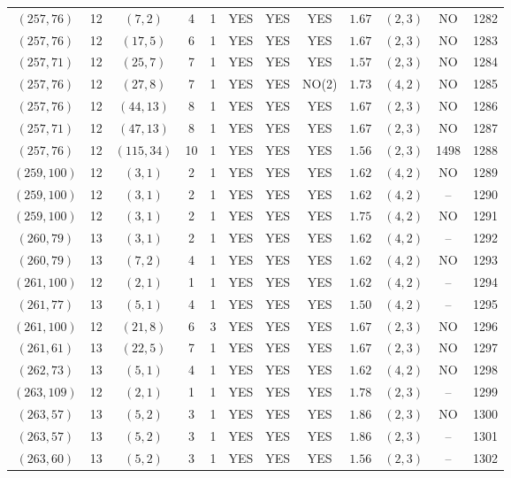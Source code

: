 \begin{longtable}{|c|c|c|c|c|c|c|c|c|c|c|c|}
$(257,76)$ & 12 & $(7,2)$ & 4 & 1 & YES & YES & YES & $1.67$ & $(2,3)$ & NO & 1282\\
$(257,76)$ & 12 & $(17,5)$ & 6 & 1 & YES & YES & YES & $1.67$ & $(2,3)$ & NO & 1283\\
$(257,71)$ & 12 & $(25,7)$ & 7 & 1 & YES & YES & YES & $1.57$ & $(2,3)$ & NO & 1284\\
$(257,76)$ & 12 & $(27,8)$ & 7 & 1 & YES & YES & NO(2) & $1.73$ & $(4,2)$ & NO & 1285\\
$(257,76)$ & 12 & $(44,13)$ & 8 & 1 & YES & YES & YES & $1.67$ & $(2,3)$ & NO & 1286\\
$(257,71)$ & 12 & $(47,13)$ & 8 & 1 & YES & YES & YES & $1.67$ & $(2,3)$ & NO & 1287\\
$(257,76)$ & 12 & $(115,34)$ & 10 & 1 & YES & YES & YES & $1.56$ & $(2,3)$ & 1498 & 1288\\
$(259,100)$ & 12 & $(3,1)$ & 2 & 1 & YES & YES & YES & $1.62$ & $(4,2)$ & NO & 1289\\
$(259,100)$ & 12 & $(3,1)$ & 2 & 1 & YES & YES & YES & $1.62$ & $(4,2)$ & -- & 1290\\
$(259,100)$ & 12 & $(3,1)$ & 2 & 1 & YES & YES & YES & $1.75$ & $(4,2)$ & NO & 1291\\
$(260,79)$ & 13 & $(3,1)$ & 2 & 1 & YES & YES & YES & $1.62$ & $(4,2)$ & -- & 1292\\
$(260,79)$ & 13 & $(7,2)$ & 4 & 1 & YES & YES & YES & $1.62$ & $(4,2)$ & NO & 1293\\
$(261,100)$ & 12 & $(2,1)$ & 1 & 1 & YES & YES & YES & $1.62$ & $(4,2)$ & -- & 1294\\
$(261,77)$ & 13 & $(5,1)$ & 4 & 1 & YES & YES & YES & $1.50$ & $(4,2)$ & -- & 1295\\
$(261,100)$ & 12 & $(21,8)$ & 6 & 3 & YES & YES & YES & $1.67$ & $(2,3)$ & NO & 1296\\
$(261,61)$ & 13 & $(22,5)$ & 7 & 1 & YES & YES & YES & $1.67$ & $(2,3)$ & NO & 1297\\
$(262,73)$ & 13 & $(5,1)$ & 4 & 1 & YES & YES & YES & $1.62$ & $(4,2)$ & NO & 1298\\
$(263,109)$ & 12 & $(2,1)$ & 1 & 1 & YES & YES & YES & $1.78$ & $(2,3)$ & -- & 1299\\
$(263,57)$ & 13 & $(5,2)$ & 3 & 1 & YES & YES & YES & $1.86$ & $(2,3)$ & NO & 1300\\
$(263,57)$ & 13 & $(5,2)$ & 3 & 1 & YES & YES & YES & $1.86$ & $(2,3)$ & -- & 1301\\
$(263,60)$ & 13 & $(5,2)$ & 3 & 1 & YES & YES & YES & $1.56$ & $(2,3)$ & -- & 1302\\

\end{longtable}
